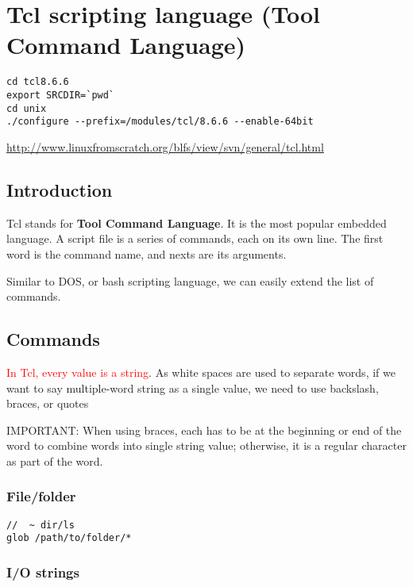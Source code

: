 \chapter{Tcl scripting language (Tool Command Language)}
\label{chap:Tcl}

\begin{verbatim}
cd tcl8.6.6
export SRCDIR=`pwd`
cd unix
./configure --prefix=/modules/tcl/8.6.6 --enable-64bit
\end{verbatim}

\url{http://www.linuxfromscratch.org/blfs/view/svn/general/tcl.html}

\section{Introduction}
\label{sec:Tcl}


Tcl stands for {\bf Tool Command Language}. It is the most popular embedded
language. A script file is a series of commands, each on its own line. The first
word is the command name, and nexts are its arguments.

Similar to DOS, or bash scripting language, we can easily extend the list of
commands.

\section{Commands}
\label{sec:Tcl-commands}

\textcolor{red}{In Tcl, every value is a string}. As white spaces are used to
separate words, if we want to say multiple-word string as a single value, we
need to use backslash, braces, or quotes


IMPORTANT: When using braces, each has to be at the beginning or end of the word
to combine words into single string value; otherwise, it is a regular character
as part of the word.

\subsection{File/folder}
\label{sec:tcl-file-folder}

\begin{verbatim}
//  ~ dir/ls
glob /path/to/folder/*

\end{verbatim}

\subsection{I/O strings}
\label{sec:tcl-IO}

